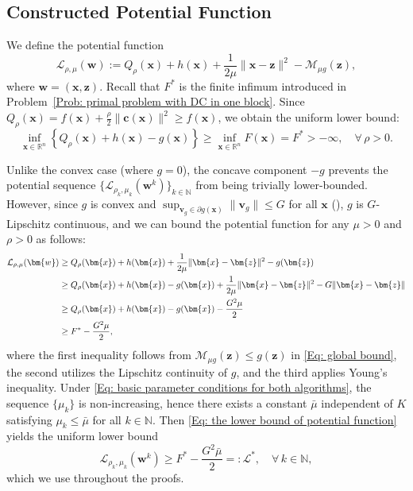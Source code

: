 \documentclass{article}
\theoremstyle{plain}
\theoremstyle{definition}
\theoremstyle{remark}
\newcommand{\RR}{\mathbb{R}}
\newcommand{\NN}{\mathbb{N}}
\newcommand{\bx}{\bm{x}}
\newcommand{\bc}{\bm{c}}
\newcommand{\bz}{\bm{z}}
\newcommand{\calL}{\mathcal{L}}
\newcommand{\calM}{\mathcal{M}}
\newcommand{\bv}{\bm{v}}
\newcommand{\bw}{\bm{w}}
\numberwithin{equation}{section}
\begin{document}
\subsection{Constructed Potential Function}
\label{Sub: constructed potential function}
We define the potential function
\begin{equation}
    \label{Eq: the potential function}
    \calL_{\rho, \mu}(\bw) := Q_{\rho}(\bx) + h(\bx) + \frac{1}{2\mu}\|\bx - \bz\|^{2} - \calM_{\mu g}(\bz),
\end{equation}
where $\bw = (\bx,\bz)$. Recall that $F^*$ is the finite infimum introduced in Problem~\eqref{Prob: primal problem with DC in one block}. Since $Q_\rho(\bx) = f(\bx) + \frac{\rho}{2}\|\bc(\bx)\|^2 \ge f(\bx)$, we obtain the uniform lower bound:
\begin{equation}
    \label{Eq: the lower bound of penalty function}
    \inf_{\bx \in \RR^n} \left\{ Q_{\rho}(\bx) + h(\bx) - g(\bx) \right\}
    \ge \inf_{\bx \in \RR^n} F(\bx) = F^* > -\infty, \quad \forall\, \rho > 0.
\end{equation}

Unlike the convex case (where $g=0$), the concave component $-g$ prevents the potential sequence $\{\calL_{\rho_k, \mu_k}(\bw^k)\}_{k \in \NN}$ from being trivially lower-bounded. However, since $g$ is convex and $\sup_{\bv_g\in\partial g(\bx)}\|\bv_g\|\le G$ for all $\bx$ (), $g$ is $G$-Lipschitz continuous, and we can bound the potential function for any $\mu > 0$ and $\rho > 0$ as follows:
\begin{align}
    \calL_{\rho, \mu}(\bw)
    &\geq Q_{\rho}(\bx) + h(\bx) + \frac{1}{2\mu}\|\bx - \bz\|^2 - g(\bz) \notag \\
    &\geq Q_{\rho}(\bx) + h(\bx) - g(\bx) + \frac{1}{2\mu}\|\bx - \bz\|^2 - G\|\bx - \bz\| \notag \\
    &\geq Q_{\rho}(\bx) + h(\bx) - g(\bx) - \frac{G^2\mu}{2} \notag \\
    &\geq F^* - \frac{G^2\mu}{2}, \label{Eq: the lower bound of potential function}
\end{align}
where the first inequality follows from $\calM_{\mu g}(\bz) \leq g(\bz)$ in \eqref{Eq: global bound}, the second utilizes the Lipschitz continuity of $g$, and the third applies Young's inequality. Under \eqref{Eq: basic parameter conditions for both algorithms}, the sequence $\{\mu_k\}$ is non-increasing, hence there exists a constant $\bar{\mu}$ independent of $K$ satisfying $\mu_k \leq \bar{\mu}$ for all $k \in \NN$. Then \eqref{Eq: the lower bound of potential function} yields the uniform lower bound
\begin{equation}
    \label{Eq: uniform lower bound L star}
    \calL_{\rho_k, \mu_k}(\bw^k) \geq F^* - \frac{G^2 \bar{\mu}}{2} =: \calL^*, \quad \forall\, k \in \NN,
\end{equation}
which we use throughout the proofs.
\end{document}
